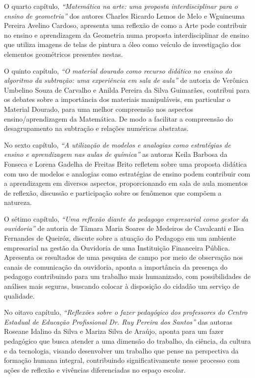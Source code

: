 O quarto capítulo, \textit{“Matemática na arte: uma proposta interdisciplinar
para o ensino de geometria”} dos autores Charles Ricardo Lemos de Melo
e Wguineuma Pereira Avelino Cardoso, apresenta uma reflexão de como a
Arte pode contribuir no ensino e aprendizagem da Geometria numa proposta
interdisciplinar de ensino que utiliza imagens de telas de pintura a óleo como
veículo de investigação dos elementos geométricos presentes nestas.

O quinto capítulo, \textit{“O material dourado como recurso didático no ensino
do algoritmo da subtração: uma experiência em sala de aula”} de autoria de
Verônica Umbelino Souza de Carvalho e Anilda Pereira da Silva
Guimarães, contribui para os debates sobre a importância dos materiais
manipuláveis, em particular o Material Dourado, para uma melhor compreensão nos
aspectos ensino/aprendizagem da Matemática. De modo a facilitar a compreensão
do desagrupamento na subtração e relações numéricas abstratas.

No sexto capítulo, \textit{“A utilização de modelos e analogias como
estratégias de ensino e aprendizagem nas aulas de química”} as autoras
Keila Barbosa da Fonseca e Lorena Gadelha de Freitas Brito
refletem sobre uma proposta didática com uso de modelos e analogias como
estratégias de ensino podem contribuir com a aprendizagem em diversos aspectos,
proporcionando em sala de aula momentos de reflexão, discussão e participação
sobre os fenômenos que compõem a natureza.

O sétimo capítulo, \textit{“Uma reflexão diante do pedagogo empresarial como
gestor da ouvidoria”} de autoria de Tâmara Maria Soares de Medeiros de
Cavalcanti e Ilsa Fernandes de Queiróz, discute sobre a atuação do Pedagogo em
um ambiente empresarial na gestão da Ouvidoria de uma Instituição Financeira
Pública. Apresenta os resultados de uma pesquisa de campo por meio de
observação nos canais de comunicação da ouvidoria, aponta a importância da
presença do pedagogo contribuindo para um trabalho mais humanizado, com
possibilidades de análises mais seguras, buscando colocar à disposição do
cidadão um serviço de qualidade.

No oitavo capítulo, \textit{“Reflexões sobre o fazer pedagógico dos professores
do Centro Estadual de Educação Profissional Dr. Ruy Pereira dos Santos”} das
autoras Roseane Idalino da Silva e Mariza Silva de Araújo, aponta para um fazer
pedagógico que busca atender a uma dimensão do trabalho, da ciência, da cultura
e da tecnologia, visando desenvolver um trabalho que pense na perspectiva da
formação humana integral, contribuindo significativamente nesse processo com
ações de reflexão e vivências diferenciadas no espaço escolar.

